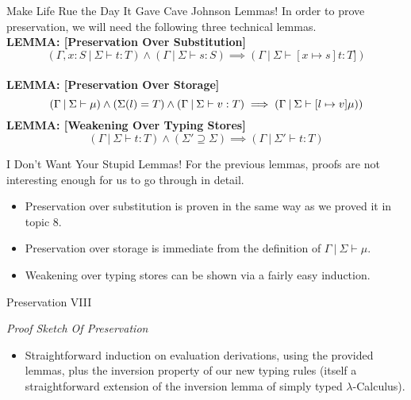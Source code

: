 \documentclass[11pt]{beamer}
\begin{document}
\begin{frame}[fragile=singleslide]{Make Life Rue the Day It Gave Cave Johnson Lemmas!}
In order to prove preservation, we will need the following three technical lemmas. \\ 
\vspace{1em}
\textbf{LEMMA: [Preservation Over Substitution]} 
\begin{equation}
(\Gamma, x:S\:|\:\Sigma \vdash t : T) \land (\Gamma \:|\:\Sigma \vdash s: S) \implies (\Gamma \:|\:\Sigma \vdash [x \mapsto s]t : T])
\end{equation} \\
\textbf{LEMMA: [Preservation Over Storage]}
\begin{equation}
(\Gamma \:|\:\Sigma \vdash \mu) \land (\Sigma(\mathnormal{l}) = T) \land (\Gamma \:|\:\Sigma \vdash v : T) \implies (\Gamma \:|\:\Sigma \vdash [\mathnormal{l} \mapsto v]\mu))
\end{equation}
\textbf{LEMMA: [Weakening Over Typing Stores]}
\begin{equation}
(\Gamma\:|\:\Sigma \vdash t : T) \land (\Sigma' \supseteq \Sigma) \implies (\Gamma \:|\:\Sigma' \vdash t : T)
\end{equation}

\end{frame}


\begin{frame}[fragile=singleslide]{I Don't Want Your Stupid Lemmas!}
For the previous lemmas, proofs are not interesting enough for us to go through in detail.
\begin{itemize}
\item Preservation over substitution is proven in the same way as we proved it in topic 8.
\item Preservation over storage is immediate from the definition of $\Gamma \:|\: \Sigma \vdash \mu$.
\item Weakening over typing stores can be shown via a fairly easy induction.
\end{itemize}
\end{frame}


\begin{frame}[fragile=singleslide]{Preservation VIII}

\emph{Proof Sketch Of Preservation}
\begin{itemize}
\item Straightforward induction on evaluation derivations, using the provided lemmas, plus the inversion property of our new typing rules (itself a straightforward extension of the inversion lemma of simply typed $\lambda$-Calculus).
\end{itemize}

\end{frame}
\end{document}
